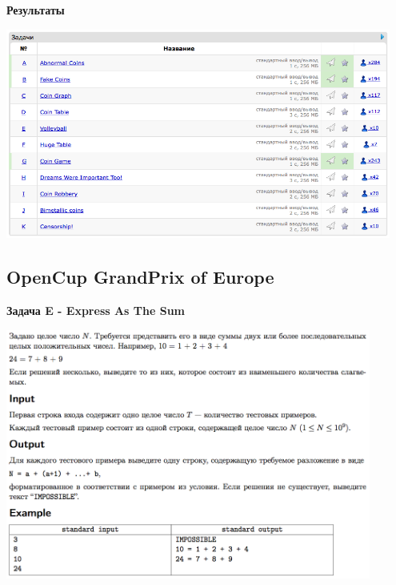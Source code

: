 \documentclass[a4paper,12pt]{article}
\begin{document}
\textbf{{\large Результаты}} \\
\begin{center}
\includegraphics[width=0.95\textwidth]{CT_S02E10/CT_S02E10_result.png}\\ [1cm]
\end{center}



%
%
\newpage
\subsection{OpenCup GrandPrix of Europe}

\textbf{{\large Задача E - Express As The Sum}} \\
\begin{center}
\includegraphics[width=0.9\textwidth]{OC_Europe/OC_Europe_E.png}\\ [1cm]
\end{center}
\newpage
\end{document}
